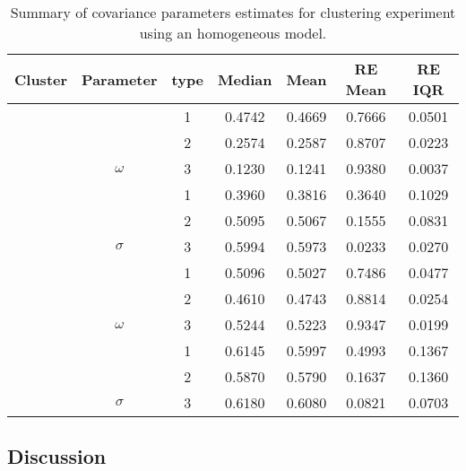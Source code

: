 \begin{table}[b]\centering
\caption{Summary of covariance parameters estimates for clustering experiment using an homogeneous model.}
\begin{knitrout}
\color{fgcolor}
\begin{tabular}{ccccccc}
\toprule
Cluster & Parameter & type & Median & Mean & RE Mean & RE IQR\\
\midrule
 &  & 1 & 0.4742 & 0.4669 & 0.7666 & 0.0501\\

 &  & 2 & 0.2574 & 0.2587 & 0.8707 & 0.0223\\

 & \multirow{-3}{*}{\centering\arraybackslash $\omega$} & 3 & 0.1230 & 0.1241 & 0.9380 & 0.0037\\
\cmidrule{2-7}
 &  & 1 & 0.3960 & 0.3816 & 0.3640 & 0.1029\\

 &  & 2 & 0.5095 & 0.5067 & 0.1555 & 0.0831\\

\multirow{-6}{*}{\centering\arraybackslash 1} & \multirow{-3}{*}{\centering\arraybackslash $\sigma$} & 3 & 0.5994 & 0.5973 & 0.0233 & 0.0270\\
\cmidrule{1-7}
 &  & 1 & 0.5096 & 0.5027 & 0.7486 & 0.0477\\

 &  & 2 & 0.4610 & 0.4743 & 0.8814 & 0.0254\\

 & \multirow{-3}{*}{\centering\arraybackslash $\omega$} & 3 & 0.5244 & 0.5223 & 0.9347 & 0.0199\\
\cmidrule{2-7}
 &  & 1 & 0.6145 & 0.5997 & 0.4993 & 0.1367\\

 &  & 2 & 0.5870 & 0.5790 & 0.1637 & 0.1360\\

\multirow{-6}{*}{\centering\arraybackslash 2} & \multirow{-3}{*}{\centering\arraybackslash $\sigma$} & 3 & 0.6180 & 0.6080 & 0.0821 & 0.0703\\
\bottomrule
\end{tabular}


\end{knitrout}
\label{tab:cl-homog-par}
\end{table}


\subsection{Discussion}

